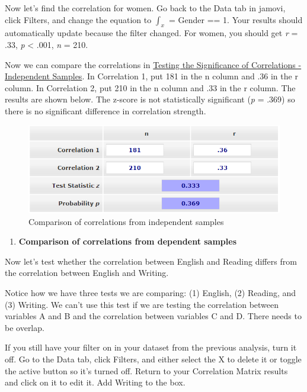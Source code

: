 \documentclass[
]{book}
\providecommand{\tightlist}{%
  \setlength{\itemsep}{0pt}\setlength{\parskip}{0pt}}
\begin{document}
Now let's find the correlation for women. Go back to the Data tab in jamovi, click Filters, and change the equation to \(\int_x\) = Gender == 1. Your results should automatically update because the filter changed. For women, you should get \emph{r} = .33, \emph{p} \textless{} .001, \emph{n} = 210.

Now we can compare the correlations in \href{https://www.psychometrica.de/correlation.html\#independent}{Testing the Significance of Correlations - Independent Samples}. In Correlation 1, put 181 in the n column and .36 in the r column. In Correlation 2, put 210 in the n column and .33 in the r column. The results are shown below. The z-score is not statistically significant (\emph{p} = .369) so there is no significant difference in correlation strength.

\begin{figure}

{\centering \includegraphics[width=1\linewidth]{images/08-correlation/compare-correlations-independent} 

}

\caption{Comparison of correlations from independent samples}\label{fig:unnamed-chunk-3}
\end{figure}

\begin{enumerate}
\def\labelenumi{\arabic{enumi}.}
\setcounter{enumi}{1}
\tightlist
\item
  \textbf{Comparison of correlations from dependent samples}
\end{enumerate}

Now let's test whether the correlation between English and Reading differs from the correlation between English and Writing.

Notice how we have three tests we are comparing: (1) English, (2) Reading, and (3) Writing. We can't use this test if we are testing the correlation between variables A and B and the correlation between variables C and D. There needs to be overlap.

If you still have your filter on in your dataset from the previous analysis, turn it off. Go to the Data tab, click Filters, and either select the X to delete it or toggle the active button so it's turned off. Return to your Correlation Matrix results and click on it to edit it. Add Writing to the box.
\end{document}
